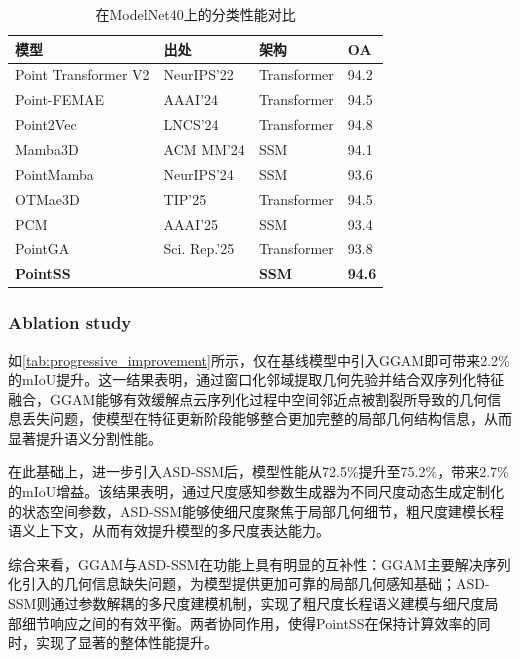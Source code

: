 \documentclass[12pt,a4paper,openany,oneside]{ctexbook}
\theoremstyle{definition}
\theoremstyle{remark}
\begin{document}
\begin{table}[htbp!]
	\centering
	\caption{在ModelNet40上的分类性能对比}
	\label{tab:ModelNet}
	\begin{tabular}{@{}llll@{}}
		\toprule
		\textbf{模型}           & \textbf{出处} & \textbf{架构} & \textbf{OA} \\ \midrule
		Point Transformer V2\cite{ptv2}  & NeurIPS'22 & Transformer & 94.2          \\
		Point-FEMAE\cite{FEMAE}        & AAAI'24 & Transformer & 94.5             \\
		Point2Vec\cite{Point2Vec}      & LNCS'24 & Transformer & 94.8          \\
		Mamba3D\cite{Mamba3D}              & ACM MM'24 & SSM & 94.1          \\
		PointMamba\cite{PointMamba}   & NeurIPS'24 & SSM         & 93.6         \\
		OTMae3D\cite{OTMae3D}    & TIP'25 & Transformer & 94.5          \\
		PCM\cite{pcm}     & AAAI'25 & SSM         & 93.4         \\
		PointGA\cite{pointga}           & Sci. Rep.'25 & Transformer & 93.8         \\
		\textbf{PointSS}               & & \textbf{SSM}             & \textbf{94.6}          \\ \bottomrule
	\end{tabular}
\end{table}


\subsubsection{Ablation study}
如\cref{tab:progressive_improvement}所示，仅在基线模型中引入GGAM即可带来2.2\%的mIoU提升。这一结果表明，通过窗口化邻域提取几何先验并结合双序列化特征融合，GGAM能够有效缓解点云序列化过程中空间邻近点被割裂所导致的几何信息丢失问题，使模型在特征更新阶段能够整合更加完整的局部几何结构信息，从而显著提升语义分割性能。

在此基础上，进一步引入ASD-SSM后，模型性能从72.5\%提升至75.2\%，带来2.7\%的mIoU增益。该结果表明，通过尺度感知参数生成器为不同尺度动态生成定制化的状态空间参数，ASD-SSM能够使细尺度聚焦于局部几何细节，粗尺度建模长程语义上下文，从而有效提升模型的多尺度表达能力。

综合来看，GGAM与ASD-SSM在功能上具有明显的互补性：GGAM主要解决序列化引入的几何信息缺失问题，为模型提供更加可靠的局部几何感知基础；ASD-SSM则通过参数解耦的多尺度建模机制，实现了粗尺度长程语义建模与细尺度局部细节响应之间的有效平衡。两者协同作用，使得PointSS在保持计算效率的同时，实现了显著的整体性能提升。
\end{document}
